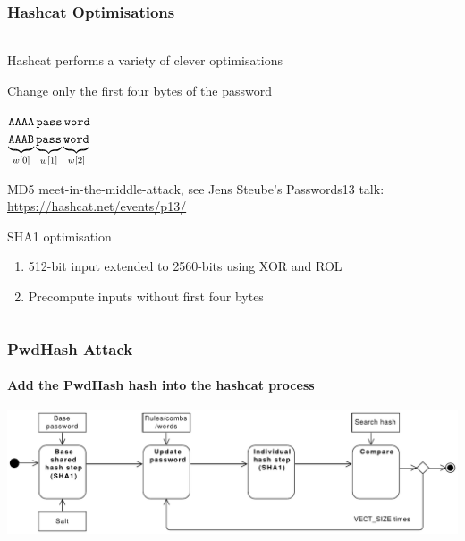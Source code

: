 \documentclass[handout, notes=hide]{beamer}
\begin{document}

\begin{frame}
\frametitle{Hashcat Optimisations}
\framesubtitle{}
\setlength{\parskip}{0.5em}

\begin{columns}[T]
\begin{column}[T]{1.0\textwidth}
\setlength{\parskip}{0.5em}

Hashcat performs a variety of clever optimisations

Change only the first four bytes of the password

${\tt AAAA}\, {\tt pass}\, {\tt word}$ \\
$\underbrace{{\tt\vphantom{p}AAAB}}_{w[0]}\underbrace{{\tt\vphantom{p}pass}}_{w[1]}\underbrace{{\tt\vphantom{p}word}}_{w[2]}$

MD5 meet-in-the-middle-attack, see Jens Steube's Passwords13 talk: \url{https://hashcat.net/events/p13/}

SHA1 optimisation
\begin{enumerate}
\item 512-bit input extended to 2560-bits using XOR and ROL
\item Precompute inputs without first four bytes
\end{enumerate}

\end{column}
\end{columns}


\end{frame}


\begin{frame}
\frametitle{PwdHash Attack}
\framesubtitle{Add the PwdHash hash into the hashcat process}
\setlength{\parskip}{0.5em}

\includegraphics[width=1.0\textwidth]{process-orig}

\end{frame}
\end{document}
